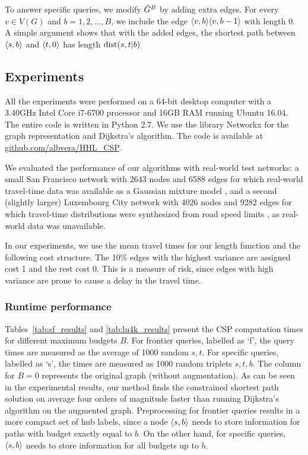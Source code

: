 To answer specific queries, we modify $\tilde G^B$ by adding extra edges.
For every $v\in V(G)$ and $b=1,2,\ldots,B$, we include the edge $\langle v,b\rangle\langle v,b-1\rangle$ with length $0$.
A simple argument shows that with the added edges, the shortest path between $\langle s,b\rangle$ and $\langle t,0\rangle$ has length $\text{dist}(s,t|b)$

\subsection{Experiments} \label{sec:exp}
All the experiments were performed on a 64-bit desktop computer with a 3.40GHz Intel Core i7-6700 processor and 16GB RAM running Ubuntu 16.04.
The entire code is written in Python 2.7. We use the library Networkx for the graph representation and Dijkstra's algorithm.
The code is available at \url{github.com/albvera/HHL_CSP}.

We evaluated the performance of our algorithms with real-world test networks: a small San Francisco network with 2643 nodes and 6588 edges for which real-world travel-time data was available as a Gaussian mixture model \cite{sf_data}, and a second (slightly larger) Luxembourg City network with 4026 nodes and 9282 edges for which travel-time distributions were synthesized from road speed limits \cite{niknami2016tractable}, as real-world data was unavailable.
 
In our experiments, we use the mean travel times for our length function and the following cost structure. The 10\% edges with the highest variance are assigned cost 1 and the rest cost 0.
This is a measure of risk, since edges with high variance are prone to cause a delay in the travel time.

\subsubsection{Runtime performance}


Tables~\ref{tab:sf_results} and \ref{tab:lu4k_results} present the CSP computation times for different maximum budgets $B$. 
For frontier queries, labelled as `f', the query times are measured as the average of 1000 random $s,t$.
For specific queries, labelled as `s', the times are measured as 1000 random triplets $s,t,b$.
The column for $B=0$ represents the original graph (without augmentation). 
As can be seen in the experimental results, our method finds the constrained shortest path solution on average four orders of magnitude faster than running Dijkstra's algorithm on the augmented graph. 
Preprocessing for frontier queries results in a more compact set of hub labels, since a node $\langle s,b\rangle$ needs to store information for paths with budget exactly equal to $b$.
On the other hand, for specific queries, $\langle s,b\rangle$ needs to store information for all budgets up to $b$.


